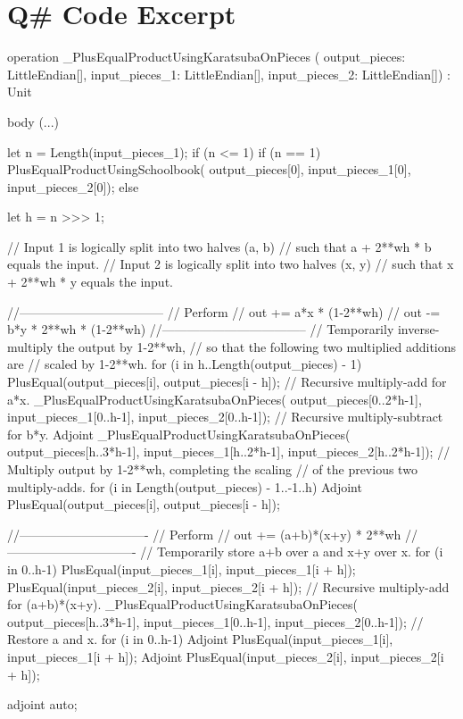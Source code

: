 \documentclass[onecolumn,unpublished]{quantumarticle}
\begin{document}
\section{Q\# Code Excerpt}

\label{app:qsharp}
\begin{qsharp}
operation _PlusEqualProductUsingKaratsubaOnPieces (
        output_pieces: LittleEndian[],
        input_pieces_1: LittleEndian[],
        input_pieces_2: LittleEndian[]) : Unit {
  body (...) {
    let n = Length(input_pieces_1);
    if (n <= 1) {
      if (n == 1) {
        PlusEqualProductUsingSchoolbook(
            output_pieces[0],
            input_pieces_1[0],
            input_pieces_2[0]);
      }
    } else {
      let h = n >>> 1;

      // Input 1 is logically split into two halves (a, b)
      //   such that a + 2**wh * b equals the input.
      // Input 2 is logically split into two halves (x, y)
      //   such that x + 2**wh * y equals the input.

      //-----------------------------------
      // Perform
      //     out += a*x * (1-2**wh)
      //     out -= b*y * 2**wh * (1-2**wh)
      //-----------------------------------
      // Temporarily inverse-multiply the output by 1-2**wh,
      // so that the following two multiplied additions are
      // scaled by 1-2**wh.
      for (i in h..Length(output_pieces) - 1) {
        PlusEqual(output_pieces[i], output_pieces[i - h]);
      }
      // Recursive multiply-add for a*x.
      _PlusEqualProductUsingKaratsubaOnPieces(
        output_pieces[0..2*h-1],
        input_pieces_1[0..h-1],
        input_pieces_2[0..h-1]);
      // Recursive multiply-subtract for b*y.
      Adjoint _PlusEqualProductUsingKaratsubaOnPieces(
        output_pieces[h..3*h-1],
        input_pieces_1[h..2*h-1],
        input_pieces_2[h..2*h-1]);
      // Multiply output by 1-2**wh, completing the scaling
      // of the previous two multiply-adds.
      for (i in Length(output_pieces) - 1..-1..h) {
        Adjoint PlusEqual(output_pieces[i],
                          output_pieces[i - h]);
      }

      //-------------------------------
      // Perform
      //     out += (a+b)*(x+y) * 2**wh
      //-------------------------------
      // Temporarily store a+b over a and x+y over x.
      for (i in 0..h-1) {
        PlusEqual(input_pieces_1[i],
                  input_pieces_1[i + h]);
        PlusEqual(input_pieces_2[i],
                  input_pieces_2[i + h]);
      }
      // Recursive multiply-add for (a+b)*(x+y).
      _PlusEqualProductUsingKaratsubaOnPieces(
        output_pieces[h..3*h-1],
        input_pieces_1[0..h-1],
        input_pieces_2[0..h-1]);
      // Restore a and x.
      for (i in 0..h-1) {
        Adjoint PlusEqual(input_pieces_1[i],
                          input_pieces_1[i + h]);
        Adjoint PlusEqual(input_pieces_2[i],
                          input_pieces_2[i + h]);
      }
    }
  }
  adjoint auto;
}
\end{qsharp}
\end{document}
